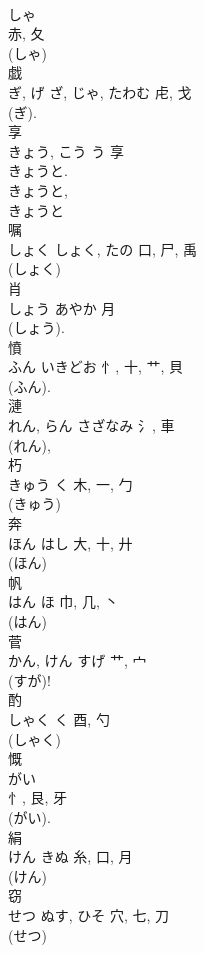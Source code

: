 \documentclass[8pt]{extreport}
\begin{document}
\begin{CJK}{UTF8}{min}
\\	しゃ	
\\	赤, 夂	
\\	(しゃ) 
\\	戯	
\\	ぎ, げ	ざ, じゃ, たわむ	虍, 戈		
\\	(ぎ). 
\\	享	
\\	きょう, こう	う	享	
\\	きょうと. 
\\	きょうと, 
\\	きょうと 
\\	嘱	
\\	しょく	しょく, たの	口, 尸, 禹	
\\	(しょく) 
\\	肖	
\\	しょう	あやか	月		
\\	(しょう). 
\\	憤	
\\	ふん	いきどお	忄, 十, 艹, 貝	
\\	(ふん). 
\\	漣	
\\	れん, らん	さざなみ	氵, 車		
\\	(れん), 
\\	朽	
\\	きゅう	く	木, 一, 勹	
\\	(きゅう) 
\\	奔	
\\	ほん	はし	大, 十, 廾	
\\	(ほん) 
\\	帆	
\\	はん	ほ	巾, 几, 丶	
\\	(はん) 
\\	菅	
\\	かん, けん	すげ	艹, 宀		
\\	(すが)! 
\\	酌	
\\	しゃく	く	酉, 勺	
\\	(しゃく) 
\\	慨	
\\	がい	
\\	忄, 艮, 牙	
\\	(がい).
\\	絹	
\\	けん	きぬ	糸, 口, 月	
\\	(けん) 
\\	窃	
\\	せつ	ぬす, ひそ	穴, 七, 刀	
\\	(せつ) 

\end{CJK}
\end{document}
